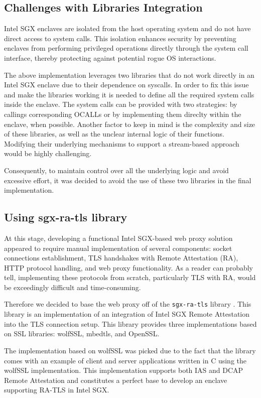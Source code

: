 \subsection{Challenges with Libraries Integration}
Intel SGX enclaves are isolated from the host operating system and do not have direct access to system calls. This isolation enhances security by preventing enclaves from performing privileged operations directly through the system call interface, thereby protecting against potential rogue OS interactions.

The above implementation leverages two libraries that do not work directly in an Intel SGX enclave due to their dependence on syscalls. In order to fix this issue and make the libraries working it is needed to define all the required system calls inside the enclave. The system calls can be provided with two strategies: by callings corresponding OCALLs or by implementing them direclty within the enclave, when possible.
Another factor to keep in mind is the complexity and size of these libraries, as well as the unclear internal logic of their functions. Modifying their underlying mechanisms to support a stream-based approach would be highly challenging.

Consequently, to maintain control over all the underlying logic and avoid excessive effort, it was decided to avoid the use of these two libraries in the final implementation.

\subsection{Using sgx-ra-tls library}
At this stage, developing a functional Intel SGX-based web proxy solution appeared to require manual implementation of several components: socket connections establishment, TLS handshakes with Remote Attestation (RA), HTTP protocol handling, and web proxy functionality. As a reader can probably tell, implementing these protocols from scratch, particularly TLS with RA, would be exceedingly difficult and time-consuming.

Therefore we decided to base the web proxy off of the \texttt{sgx-ra-tls} library \cite{sgx-ra-tls}. This library is an implementation of  an integration of Intel SGX Remote Attestation into the TLS connection setup. This library provides three implementations based on SSL libraries: wolfSSL, mbedtls, and OpenSSL.

The implementation based on wolfSSL was picked due to the fact that the library comes with an example of client and server applications written in C using the wolfSSL implementation. This implementation supports both IAS and DCAP Remote Attestation and constitutes a perfect base to develop an enclave supporting RA-TLS in Intel SGX. 

